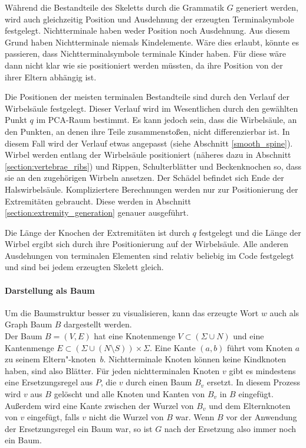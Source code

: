 Während die Bestandteile des Skeletts durch die Grammatik $G$ generiert werden, wird auch gleichzeitig Position und Ausdehnung der erzeugten Terminalsymbole festgelegt. Nichtterminale haben weder Position noch Ausdehnung. Aus diesem Grund haben Nichtterminale niemals Kindelemente. Wäre dies erlaubt, könnte es passieren, dass Nichtterminalsymbole terminale Kinder haben. Für diese wäre dann nicht klar wie sie positioniert werden müssten, da ihre Position von der ihrer Eltern abhängig ist.

Die Positionen der meisten terminalen Bestandteile sind durch den Verlauf der Wirbelsäule festgelegt. Dieser Verlauf wird im Wesentlichen durch den gewählten Punkt $q$ im PCA-Raum bestimmt. Es kann jedoch sein, dass die Wirbelsäule, an den Punkten, an denen ihre Teile zusammenstoßen, nicht differenzierbar ist. In diesem Fall wird der Verlauf etwas angepasst (siehe Abschnitt \ref{smooth_spine}).\\
Wirbel werden entlang der Wirbelsäule positioniert (näheres dazu in Abschnitt \ref{section:vertebrae_ribs}) und Rippen, Schulterblätter und Beckenknochen so, dass sie an den zugehörigen Wirbeln ansetzen. Der Schädel befindet sich Ende der Halswirbelsäule. Kompliziertere Berechnungen werden nur zur Positionierung der Extremitäten gebraucht. Diese werden in Abschnitt \ref{section:extremity_generation} genauer ausgeführt.

Die Länge der Knochen der Extremitäten ist durch $q$ festgelegt und die Länge der Wirbel ergibt sich durch ihre Positionierung auf der Wirbelsäule. Alle anderen Ausdehungen von terminalen Elementen sind relativ beliebig im Code festgelegt und sind bei jedem erzeugten Skelett gleich.


\paragraph{Darstellung als Baum}
Um die Baumstruktur besser zu visualisieren, kann das erzeugte Wort $w$ auch als Graph \bzw Baum $B$ dargestellt werden.\\
Der Baum $B = (V, E)$ hat eine Knotenmenge $V \subset (\Sigma \cup N)$ und eine Kantenmenge $E \subset (\Sigma \cup (N \setminus S)) \times \Sigma$. Eine Kante $(a, b)$ führt vom Knoten $a$ zu seinem Eltern"-\mbox{knoten $b$}. Nichtterminale Knoten können keine Kindknoten haben, sind also Blätter. Für jeden nichtterminalen Knoten $v$ gibt es mindestens eine Ersetzungsregel aus $P$, die $v$ durch einen Baum $B_v$ ersetzt. In diesem Prozess wird $v$ aus $B$ gelöscht und alle Knoten und Kanten von $B_v$ in $B$ eingefügt. Außerdem wird eine Kante zwischen der Wurzel von $B_v$ und dem Elternknoten von $v$ eingefügt, falls $v$ nicht die Wurzel von $B$ war. Wenn $B$ vor der Anwendung der Ersetzungsregel ein Baum war, so ist $G$ nach der Ersetzung also immer noch ein Baum.

